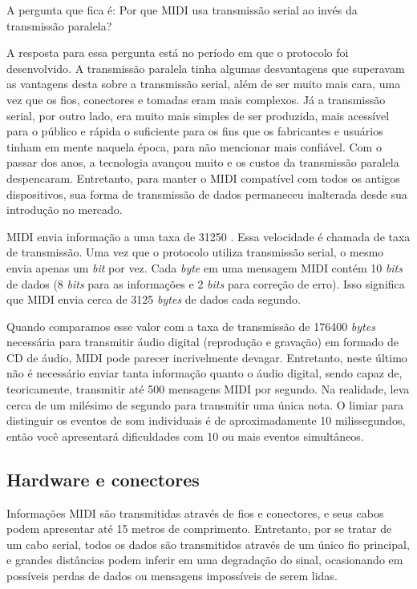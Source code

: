             A pergunta que fica é: Por que MIDI usa transmissão serial ao invés da transmissão paralela?

            A resposta para essa pergunta está no período em que o protocolo foi desenvolvido. A transmissão paralela tinha algumas desvantagens que superavam as vantagens desta sobre a transmissão serial, além de ser muito mais cara, uma vez que os fios, conectores e tomadas eram mais complexos. Já a transmissão serial, por outro lado, era muito mais simples de ser produzida, mais acessível para o público e rápida o suficiente para os fins que os fabricantes e usuários tinham em mente naquela época, para não mencionar mais confiável. Com o passar dos anos, a tecnologia avançou muito e os custos da transmissão paralela despencaram. Entretanto, para manter o MIDI compatível com todos os antigos dispositivos, sua forma de transmissão de dados permaneceu inalterada desde sua introdução no mercado.
            
            MIDI envia informação a uma taxa de 31250 . Essa velocidade é chamada de taxa de transmissão. Uma vez que o protocolo utiliza transmissão serial, o mesmo envia apenas um \textit{bit} por vez. Cada \textit{byte} em uma mensagem MIDI contém 10 \textit{bits} de dados (8 \textit{bits} para as informações e 2 \textit{bits} para correção de erro). Isso significa que MIDI envia cerca de 3125 \textit{bytes} de dados cada segundo.
            
            Quando comparamos esse valor com a taxa de transmissão de 176400 \textit{bytes} necessária para transmitir áudio digital (reprodução e gravação) em formado de CD de áudio, MIDI pode parecer incrivelmente devagar. Entretanto, neste último não é necessário enviar tanta informação quanto o áudio digital, sendo capaz de, teoricamente, transmitir até 500 mensagens MIDI por segundo. Na realidade, leva cerca de um milésimo de segundo para transmitir uma única nota. O limiar para distinguir os eventos de som individuais é de aproximadamente 10 milissegundos, então você apresentará dificuldades com 10 ou mais eventos simultâneos.
        
        \subsection{Hardware e conectores}

            Informações MIDI são transmitidas através de fios e conectores, e seus cabos podem apresentar até 15 metros de comprimento. Entretanto, por se tratar de um cabo serial, todos os dados são transmitidos através de um único fio principal, e grandes distâncias podem inferir em uma degradação do sinal, ocasionando em possíveis perdas de dados ou mensagens impossíveis de serem lidas.
            
